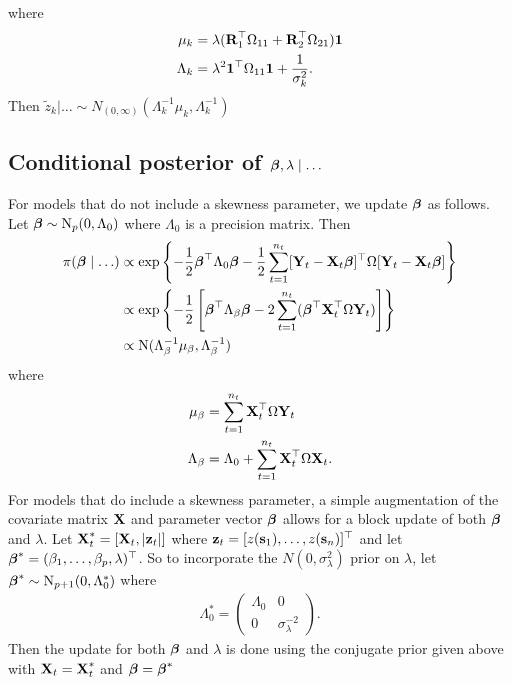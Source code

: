 \documentclass[useAMS,usenatbib,referee]{biomweb}
\begin{document}
where
\begin{align*}
    \mu_k &= \lambda ( \mbox{\bf R}_1^\top \Omega_{11} + \mbox{\bf R}_2^\top \Omega_{21} )\mbox{\boldmath $1$}\\
    \Lambda_k &= \lambda^2 \mbox{\boldmath $1$}^\top \Omega_{11} \mbox{\boldmath $1$} + \frac{ 1 }{ \sigma^2_k }.
\end{align*}
Then $\tilde{z}_k | \ldots \sim N_{(0, \infty)} (\Lambda_k^{-1} \mu_k, \Lambda_k^{-1})$

\subsection*{Conditional posterior of $\mbox{\boldmath $\beta$}, \lambda \mid \ldots$}\label{sts:betapost}
For models that do not include a skewness parameter, we update $\mbox{\boldmath $\beta$}$ as follows.
Let $\mbox{\boldmath $\beta$} \sim \mbox{N}_{p}(0, \Lambda_0)$ where $\Lambda_0$ is a precision matrix.
Then
\begin{align*}
    \pi(\mbox{\boldmath $\beta$} \mid \ldots) & \propto \exp \left\{ - \frac{ 1 }{ 2 } \mbox{\boldmath $\beta$}^\top \Lambda_0 \mbox{\boldmath $\beta$} - \frac{ 1 }{ 2 } \sum_{t = 1}^{n_t} [\mbox{\bf Y}_t -\mbox{\bf X}_t \mbox{\boldmath $\beta$}]^\top \Omega [\mbox{\bf Y}_t - \mbox{\bf X}_t \mbox{\boldmath $\beta$}] \right\} \\
     & \propto \exp \left\{ -\frac{ 1 }{ 2 } \left[ \mbox{\boldmath $\beta$}^\top \Lambda_\beta \mbox{\boldmath $\beta$}  - 2 \sum_{t = 1}^{n_t} (\mbox{\boldmath $\beta$}^\top \mbox{\bf X}_t^\top \Omega \mbox{\bf Y}_t) \right] \right\} \\
     & \propto \mbox{N} ( \Lambda_\beta^{-1} \mu_\beta , \Lambda_\beta^{-1})
\end{align*}
where
\begin{align*}
    \mu_\beta &= \sum_{t = 1}^{n_t} \mbox{\bf X}_t^\top \Omega \mbox{\bf Y}_t \\
    \Lambda_\beta &= \Lambda_0 + \sum_{t = 1}^{n_t} \mbox{\bf X}_t^\top \Omega \mbox{\bf X}_t.
\end{align*}
For models that do include a skewness parameter, a simple augmentation of the covariate matrix $\mbox{\bf X}$ and parameter vector $\mbox{\boldmath $\beta$}$ allows for a block update of both $\mbox{\boldmath $\beta$}$ and $\lambda$.
Let $\mbox{\bf X}^*_{t} = [\mbox{\bf X}_t, |\mbox{\bf z}_{t}|]$ where $\mbox{\bf z}_t = [z(\mbox{\bf s}_1), \ldots, z(\mbox{\bf s}_{n})]^\top$ and let $\mbox{\boldmath $\beta$}^* = (\beta_1, \ldots, \beta_p, \lambda)^\top$.
So to incorporate the $N(0, \sigma^2_\lambda)$ prior on $\lambda$, let $\mbox{\boldmath $\beta$}^* \sim \mbox{N}_{p+1}(0, \Lambda^*_0)$ where
\begin{align*}
  \Lambda^*_0 = \left( \begin{array}{cc}
    \Lambda_0 & 0 \\
    0         & \sigma^{-2}_\lambda
  \end{array}\right).
\end{align*}
Then the update for both $\mbox{\boldmath $\beta$}$ and $\lambda$ is done using the conjugate prior given above with $\mbox{\bf X}_t = \mbox{\bf X}_t^*$ and $\mbox{\boldmath $\beta$} = \mbox{\boldmath $\beta$}^*$
\end{document}
